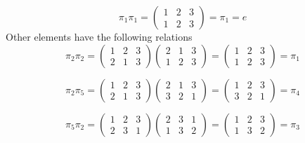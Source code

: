 \documentclass[a4paper,12pt]{article}
\theoremstyle{definition}
\begin{document}
\begin{equation*}
\pi_1 \pi_1 =
\begin{pmatrix}
1 & 2 & 3 \\
1 & 2 & 3
\end{pmatrix}
= \pi_1 = e
\end{equation*}
Other elements have the following relations 
\begin{equation*}
\pi_2 \pi_2 =
\begin{pmatrix}
1 & 2 & 3 \\
2 & 1 & 3
\end{pmatrix}
\begin{pmatrix}
2 & 1 & 3 \\
1 & 2 & 3 
\end{pmatrix}
=
\begin{pmatrix}
1 & 2 & 3 \\
1 & 2 & 3
\end{pmatrix}
= \pi_1
\end{equation*}

\begin{equation*}
\pi_2 \pi_5 =
\begin{pmatrix}
1 & 2 & 3 \\
2 & 1 & 3
\end{pmatrix}
\begin{pmatrix}
2 & 1 & 3 \\
3 & 2 & 1
\end{pmatrix}
=
\begin{pmatrix}
1 & 2 & 3 \\
3 & 2 & 1
\end{pmatrix}
= \pi_4
\end{equation*}

\begin{equation*}
\pi_5 \pi_2 =
\begin{pmatrix}
1 & 2 & 3 \\
2 & 3 & 1
\end{pmatrix}
\begin{pmatrix}
2 & 3 & 1 \\
1 & 3 & 2
\end{pmatrix}
=
\begin{pmatrix}
1 & 2 & 3 \\
1 & 3 & 2
\end{pmatrix}
= \pi_3
\end{equation*}
\end{document}
